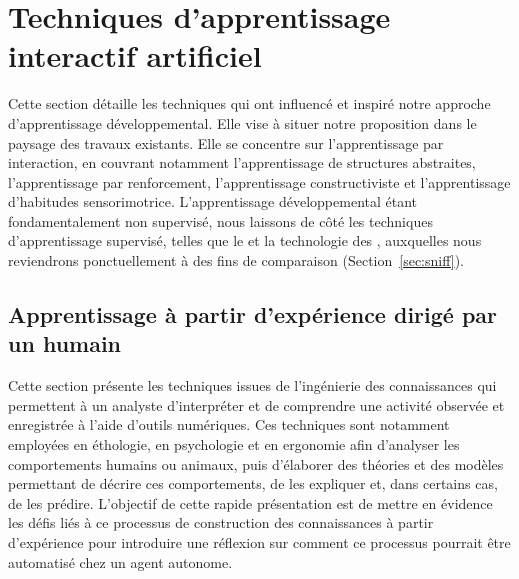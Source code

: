 \section{Techniques d'apprentissage interactif artificiel}
\label{sec:techniques}


\noindent
Cette section détaille les techniques qui ont influencé et inspiré notre approche d'apprentissage développemental.
Elle vise à situer notre proposition dans le paysage des travaux existants. 
Elle se concentre sur l'apprentissage par interaction, en couvrant notamment l'apprentissage de structures abstraites, l'apprentissage par renforcement, l'apprentissage constructiviste et l'apprentissage d'habitudes sensorimotrice. 
L'apprentissage développemental étant fondamentalement non supervisé, nous laissons de côté les techniques d'apprentissage supervisé, telles que le  et la technologie des , auxquelles nous reviendrons ponctuellement à des fins de comparaison (Section~\ref{sec:sniff}).





\subsection{Apprentissage à partir d'expérience dirigé par un humain}

\noindent
Cette section présente les techniques issues de l'ingénierie des connaissances qui permettent à un analyste d'interpréter et de comprendre une activité observée et enregistrée à l'aide d'outils numériques. 
Ces techniques sont notamment employées en éthologie, en psychologie et en ergonomie afin d’analyser les comportements humains ou animaux, puis d’élaborer des théories et des modèles permettant de décrire ces comportements, de les expliquer et, dans certains cas, de les prédire.
L'objectif de cette rapide présentation est de mettre en évidence les défis liés à ce processus de construction des connaissances à partir d'expérience pour introduire une réflexion sur comment ce processus pourrait être automatisé chez un agent autonome.


